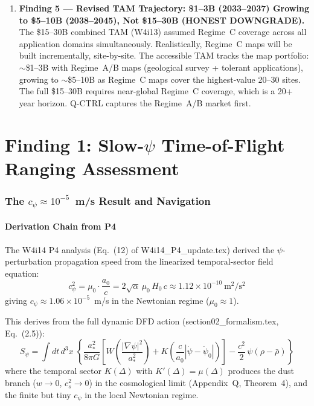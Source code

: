 \documentclass[11pt]{article}
\theoremstyle{definition}
\theoremstyle{remark}
\newcommand{\ee}[1]{\times10^{#1}}
\begin{document}
\begin{enumerate}
\item \textbf{Finding 5 --- Revised TAM Trajectory: \$1--3B (2033--2037)
  Growing to \$5--10B (2038--2045), Not \$15--30B (HONEST DOWNGRADE).}
  The \$15--30B combined TAM (W4i13) assumed Regime~C coverage across
  all application domains simultaneously. Realistically, Regime~C maps
  will be built incrementally, site-by-site. The accessible TAM tracks
  the map portfolio: $\sim$\$1--3B with Regime~A/B maps (geological
  survey + tolerant applications), growing to $\sim$\$5--10B as
  Regime~C maps cover the highest-value 20--30 sites. The full
  \$15--30B requires near-global Regime~C coverage, which is a
  20+ year horizon. Q-CTRL captures the Regime~A/B market first.
\end{enumerate}

\part{Finding 1: Slow-$\psi$ Time-of-Flight Ranging Assessment}
\label{part:slow-psi}

\section{The $c_\psi \approx 10^{-5}$~m/s Result and Navigation}
\label{sec:slow-psi-nav}

\subsection{Derivation Chain from P4}

The W4i14 P4 analysis (Eq.~(12) of W4i14\_P4\_update.tex) derived the
$\psi$-perturbation propagation speed from the linearized temporal-sector
field equation:
\begin{equation}
c_\psi^2 = \mu_0 \cdot \frac{a_0}{c}
= 2\sqrt{\alpha}\,\mu_0\,H_0\,c
\approx 1.12\ee{-10}~\mathrm{m^2/s^2}
\label{eq:c-psi-inherited}
\end{equation}
giving $c_\psi \approx 1.06\ee{-5}$~m/s in the Newtonian regime
($\mu_0 \approx 1$).

This derives from the full dynamic DFD action (section02\_formalism.tex,
Eq.~(2.5)):
\begin{equation}
S_\psi = \int dt\,d^3x\;\left\{
  \frac{a_*^2}{8\pi G}\left[
    W\!\left(\frac{|\nabla\psi|^2}{a_*^2}\right)
    + K\!\left(\frac{c}{a_0}|\dot\psi{-}\dot\psi_0|\right)
  \right]
  - \frac{c^2}{2}\,\psi(\rho - \bar\rho)
\right\}
\label{eq:full-action}
\end{equation}
where the temporal sector $K(\Delta)$ with $K'(\Delta) = \mu(\Delta)$
produces the dust branch ($w \to 0$, $c_s^2 \to 0$) in the
cosmological limit (Appendix~Q, Theorem~4), and the finite but tiny
$c_\psi$ in the local Newtonian regime.
\end{document}
